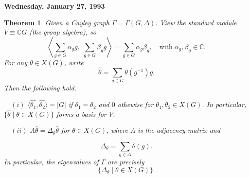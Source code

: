 \documentclass[
]{book}
\newtheorem{theorem}{Theorem}[chapter]
\theoremstyle{definition}
\theoremstyle{definition}
\theoremstyle{definition}
\theoremstyle{definition}
\theoremstyle{remark}
\begin{document}
\textbf{Wednesday, January 27, 1993}

\begin{theorem}
\protect\hypertarget{thm:charcter-group}{}\label{thm:charcter-group}Given a Cayley graph \(\Gamma = \Gamma(G, \Delta)\). View the standard module \(V \equiv \mathbb{C}G\) (the group algebra), so
\[\left\langle \sum_{g\in G}\alpha_g g, \;\sum_{g\in G}\beta_g g\right\rangle = \sum_{g\in G}\alpha_g\overline{\beta_g}, \quad \textrm{with}\; \alpha_g, \beta_g\in \mathbb{C}.\]
For any \(\theta\in X(G)\), write
\[\hat{\theta} = \sum_{g\in G}\theta(g^{-1})g.\]
Then the following hold.

~~\((i)\) \(\langle \hat{\theta_1}, \hat{\theta_2}\rangle = |G|\) if \(\theta_1 = \theta_2\) and \(0\) othewise for \(\theta_1, \theta_2\in X(G)\). In particular, \(\{\hat{\theta}\mid \theta\in X(G)\}\) forms a basis for \(V\).

~~\((ii)\) \(A\hat{\theta} = \Delta_\theta \hat{\theta}\) for \(\theta \in X(G)\), where \(A\) is the adjacency matrix and

\[\Delta_\theta = \sum_{g\in \Delta}\theta(g).\]
In particular, the eigenvalues of \(\Gamma\) are precisely
\[\{\Delta_\theta \mid \theta\in X(G)\}.\]
\end{theorem}
\end{document}
